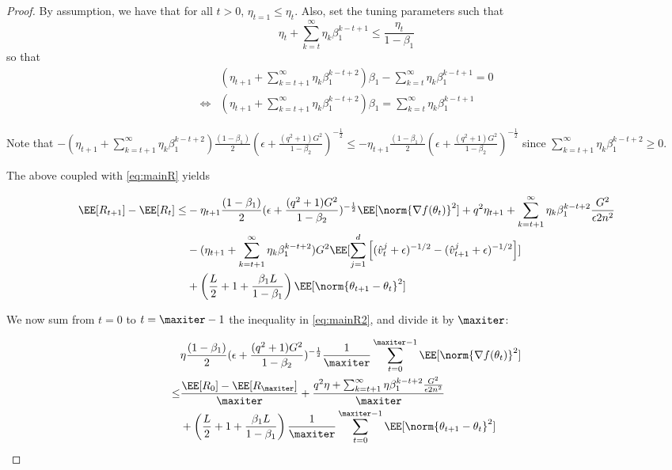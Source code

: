 \documentclass[11pt]{article}
\begin{document}
\begin{proof}
By assumption, we have that for all $t >0$, $\eta_{t=1} \leq \eta_t$.
Also, set the tuning parameters such that
\begin{equation}
 \eta_{t}+ \sum_{k=t}^\infty \eta_{k} \beta_1^{k-t+1} \leq \frac{\eta_t}{1 - \beta_1}
 \end{equation}
 so that 
\begin{equation}
\begin{split}
& (\eta_{t+1} + \sum_{k=t+1}^\infty \eta_{k} \beta_1^{k-t+2}) \beta_1- \sum_{k=t}^\infty \eta_{k} \beta_1^{k-t+1} = 0\\
\iff& (\eta_{t+1} + \sum_{k=t+1}^\infty \eta_{k} \beta_1^{k-t+2}) \beta_1 = \sum_{k=t}^\infty \eta_{k} \beta_1^{k-t+1}
\end{split}
\end{equation}

Note that $- (\eta_{t+1}+ \sum_{k=t+1}^\infty \eta_{k} \beta_1^{k-t+2})\frac{(1-\beta_1)}{2}  (\epsilon + \frac{(q^2+1)G^2}{1 - \beta_2})^{-\frac{1}{2}}\leq - \eta_{t+1}\frac{(1-\beta_1)}{2} (\epsilon + \frac{(q^2+1)G^2}{1 - \beta_2})^{-\frac{1}{2}}$ since $ \sum_{k=t+1}^\infty \eta_{k} \beta_1^{k-t+2} \geq 0$.

The above coupled with \eqref{eq:mainR} yields

\begin{equation}\label{eq:mainR2}
\begin{split}
\EE[R_{t+1}] - \EE[R_t] \leq & - \eta_{t+1}\frac{(1-\beta_1)}{2} (\epsilon + \frac{(q^2+1)G^2}{1 - \beta_2})^{-\frac{1}{2}} \EE[\norm{\nabla f(\theta_t)}^2]+q^2 \eta_{t+1}+ \sum_{k=t+1}^\infty \eta_{k} \beta_1^{k-t+2}\frac{G^2 }{\epsilon 2n^2}\\
&  -  (\eta_{t+1}+ \sum_{k=t+1}^\infty \eta_{k} \beta_1^{k-t+2}) G^2 \EE[\sum_{j=1}^d \left[(\hat{v}^j_{t} + \epsilon )^{-1/2} - (\hat{v}^j_{t+1} + \epsilon )^{-1/2}  \right] ]\\
& + \left(\frac{L}{2} + 1+ \frac{\beta_1L}{1-\beta_1} \right)  \EE[ \norm{\theta_{t+1} - \theta_{t}}^2]
\end{split}
\end{equation}

We now sum from $t = 0$ to $t = \maxiter -1$  the inequality in \eqref{eq:mainR2}, and divide it by $\maxiter$:

\begin{equation}\label{eq:finalR2}
\begin{split}
&\eta\frac{(1-\beta_1)}{2} (\epsilon + \frac{(q^2+1)G^2}{1 - \beta_2})^{-\frac{1}{2}} \frac{1}{\maxiter}\sum_{t=0}^{\maxiter -1} \EE[\norm{\nabla f(\theta_t)}^2] \\
\leq & \frac{\EE[R_0] - \EE[R_{\maxiter}]}{\maxiter} + \frac{q^2 \eta+ \sum_{k=t+1}^\infty \eta \beta_1^{k-t+2}\frac{G^2 }{\epsilon 2n^2}}{\maxiter}\\
& + \left(\frac{L}{2} + 1+ \frac{\beta_1L}{1-\beta_1} \right)\frac{1}{\maxiter}  \sum_{t=0}^{\maxiter -1}\EE[ \norm{\theta_{t+1} - \theta_{t}}^2]
\end{split}
\end{equation}


\end{proof}
\end{document}
